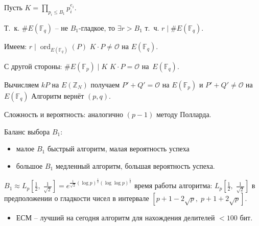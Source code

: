 \documentclass{beamer}
\begin{document}
\begin{frame}
\ProofBegin
Пусть $ K = \prod\limits_{p_i \leq B_1} p_i^{e_i}$.

\vspace{0.5em}
Т.~к. $\#E(\mathbb{F}_q)$ -- не $B_1$-гладкое, то $\exists r > B_1$ т.~ч. $r \mid \#E(\mathbb{F}_q)$.

Имеем: $r \mid \operatorname{ord}_{E(\mathbb{F}_q)}(P)$ \MyImplies $K \cdot P \neq \mathcal{O}$ на $E(\mathbb{F}_q)$.
\vspace{0.5em}

С другой стороны: $\#E(\mathbb{F}_p) \mid K$ \MyImplies $K \cdot P = \mathcal{O}$ на~$E(\mathbb{F}_q)$.

Вычисляем $k P$ на $E(\mathbb{Z}_N)$ \MyImplies получаем $P' + Q' = \mathcal{O}$ на $E(\mathbb{F}_p)$ и $P' + Q' \neq \mathcal{O}$ на $E(\mathbb{F}_q)$ \MyImplies Алгоритм вернёт $(p, q)$.

\vspace{0.5em}
Сложность и вероятность: аналогично $(p-1)$ методу Полларда. 
\ProofEnd
\end{frame}

\begin{frame}
 Баланс выбора $B_1$:
\begin{itemize}
    \item малое $B_1$ \structure{$\Rightarrow$} быстрый алгоритм, малая вероятность успеха 
    \item большое $B_1$ \structure{$\Rightarrow$} медленный алгоритм, большая вероятность успеха. 
\end{itemize}

 ${B_1} \approx {L_p}[ \frac{1}{2},\;\frac{1}{\sqrt 2 }] = e^{\frac{1}{\sqrt 2 }(\log p)^\frac{1}{2}(\log\log p)^\frac{1}{2}}$  \structure{$\Rightarrow$} время работы алгоритма: ${L_p}[ \frac{1}{2},\;\frac{1}{\sqrt 2 }]$ в предположении о гладкости чисел в интервале 
$[ {p + 1 - 2\sqrt p ,\;p + 1 + 2\sqrt p } ]$.
\begin{itemize}
    \item ЕСМ -- лучший на сегодня алгоритм для нахождения делителей $< 100$ бит.
\end{itemize} 
\end{frame}

\end{document}
